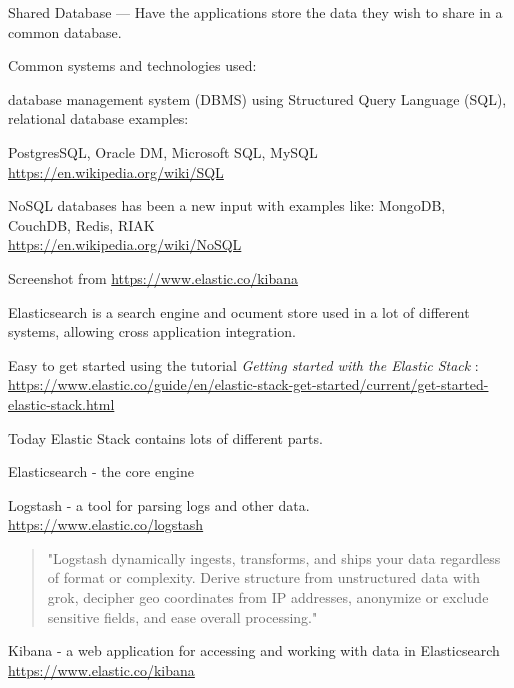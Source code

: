 \documentclass[Screen16to9,17pt]{foils}
\begin{document}

Shared Database — Have the applications store the data they wish to share in a common database.

Common systems and technologies used:
\begin{list2}
\item database management system (DBMS) using Structured Query Language (SQL), relational database examples:\\
\item PostgresSQL, Oracle DM, Microsoft SQL, MySQL
\url{https://en.wikipedia.org/wiki/SQL}
\item NoSQL databases has been a new input with examples like:
MongoDB, CouchDB, Redis, RIAK\\
\url{https://en.wikipedia.org/wiki/NoSQL}
\end{list2}







Screenshot from \url{https://www.elastic.co/kibana}

Elasticsearch is a search engine and ocument store used in a lot of different systems, allowing cross application integration.


Easy to get started using the tutorial \emph{Getting started with the Elastic Stack} :\\
{\footnotesize\url{https://www.elastic.co/guide/en/elastic-stack-get-started/current/get-started-elastic-stack.html}}

Today Elastic Stack contains lots of different parts.

\begin{list2}
\item Elasticsearch - the core engine
\item Logstash - a tool for parsing logs and other data.\\
\url{https://www.elastic.co/logstash}
\begin{quote}
"Logstash dynamically ingests, transforms, and ships your data regardless of format or complexity. Derive structure from unstructured data with grok, decipher geo coordinates from IP addresses, anonymize or exclude sensitive fields, and ease overall processing."
\end{quote}
\item Kibana - a web application for accessing and working with data in Elasticsearch\\
\url{https://www.elastic.co/kibana}
\end{list2}
\end{document}
